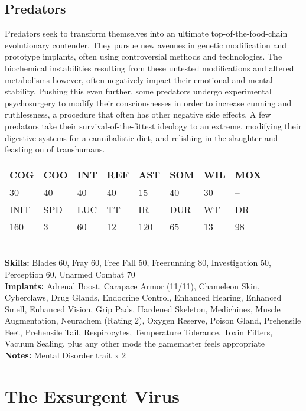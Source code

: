 \subsection{Predators} 

Predators seek to transform themselves into an ultimate top-of-the-food-chain evolutionary contender. They pursue new avenues in genetic modification and prototype implants, often using controversial methods and technologies. The biochemical instabilities resulting from these untested modifications and altered metabolisms however, often negatively impact their emotional and mental stability. Pushing this even further, some predators undergo experimental psychosurgery to modify their consciousnesses in order to increase cunning and ruthlessness, a procedure that often has other negative side effects. A few predators take their survival-of-the-fittest ideology to an extreme, modifying their digestive systems for a cannibalistic diet, and relishing in the slaughter and feasting on of transhumans. 

\begin{tabular}{|l|l|l|l|l|l|l|l|} \hline

COG &COO &INT &REF &AST &SOM &WIL &MOX \\ \hline

30 &40 &40 &40 &15 &40 &30 &-- \\ \hline

INIT &SPD &LUC &TT &IR &DUR &WT &DR \\ \hline

160 &3 &60 &12 &120 &65 &13 &98 \\ \hline

\end{tabular} \\ \textbf{Skills:} Blades 60, Fray 60, Free Fall 50, Freerunning 80, Investigation 50, Perception 60, Unarmed Combat 70 \\ \textbf{Implants:} Adrenal Boost, Carapace Armor (11/11), Chameleon Skin, Cyberclaws, Drug Glands, Endocrine Control, Enhanced Hearing, Enhanced Smell, Enhanced Vision, Grip Pads, Hardened Skeleton, Medichines, Muscle Augmentation, Neurachem (Rating 2), Oxygen Reserve, Poison Gland, Prehensile Feet, Prehensile Tail, Respirocytes, Temperature Tolerance, Toxin Filters, Vacuum Sealing, plus any other mods the gamemaster feels appropriate \\ \textbf{Notes:} Mental Disorder trait x 2 

\section{The Exsurgent Virus } 

